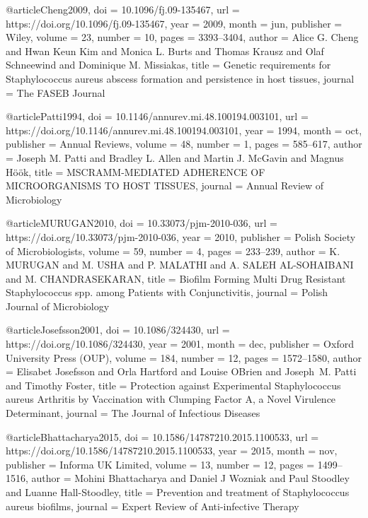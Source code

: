 @article{Cheng2009,
  doi = {10.1096/fj.09-135467},
  url = {https://doi.org/10.1096/fj.09-135467},
  year = {2009},
  month = jun,
  publisher = {Wiley},
  volume = {23},
  number = {10},
  pages = {3393--3404},
  author = {Alice G. Cheng and Hwan Keun Kim and Monica L. Burts and Thomas Krausz and Olaf Schneewind and Dominique M. Missiakas},
  title = {Genetic requirements for Staphylococcus aureus abscess formation and persistence in host tissues},
  journal = {The {FASEB} Journal}
}

@article{Patti1994,
  doi = {10.1146/annurev.mi.48.100194.003101},
  url = {https://doi.org/10.1146/annurev.mi.48.100194.003101},
  year = {1994},
  month = oct,
  publisher = {Annual Reviews},
  volume = {48},
  number = {1},
  pages = {585--617},
  author = {Joseph M. Patti and Bradley L. Allen and Martin J. McGavin and Magnus H\"{o}\"{o}k},
  title = {{MSCRAMM}-{MEDIATED} {ADHERENCE} {OF} {MICROORGANISMS} {TO} {HOST} {TISSUES}},
  journal = {Annual Review of Microbiology}
}

@article{MURUGAN2010,
  doi = {10.33073/pjm-2010-036},
  url = {https://doi.org/10.33073/pjm-2010-036},
  year = {2010},
  publisher = {Polish Society of Microbiologists},
  volume = {59},
  number = {4},
  pages = {233--239},
  author = {K. MURUGAN and M. USHA and P. MALATHI and A. SALEH AL-SOHAIBANI and M. CHANDRASEKARAN},
  title = {Biofilm Forming Multi Drug Resistant Staphylococcus spp. among Patients with Conjunctivitis},
  journal = {Polish Journal of Microbiology}
}

@article{Josefsson2001,
  doi = {10.1086/324430},
  url = {https://doi.org/10.1086/324430},
  year = {2001},
  month = dec,
  publisher = {Oxford University Press ({OUP})},
  volume = {184},
  number = {12},
  pages = {1572--1580},
  author = {Elisabet Josefsson and Orla Hartford and Louise O{\textquotesingle}Brien and Joseph~M. Patti and Timothy Foster},
  title = {Protection against Experimental Staphylococcus aureus Arthritis by Vaccination with Clumping Factor A,  a Novel Virulence Determinant},
  journal = {The Journal of Infectious Diseases}
}

@article{Bhattacharya2015,
  doi = {10.1586/14787210.2015.1100533},
  url = {https://doi.org/10.1586/14787210.2015.1100533},
  year = {2015},
  month = nov,
  publisher = {Informa {UK} Limited},
  volume = {13},
  number = {12},
  pages = {1499--1516},
  author = {Mohini Bhattacharya and Daniel J Wozniak and Paul Stoodley and Luanne Hall-Stoodley},
  title = {Prevention and treatment of Staphylococcus aureus biofilms},
  journal = {Expert Review of Anti-infective Therapy}
}

